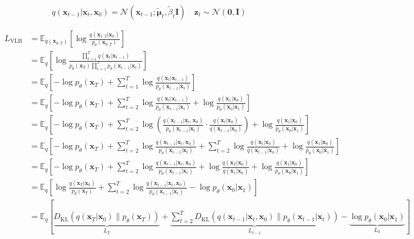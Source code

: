 \documentclass[a4paper, 11pt]{article}
\begin{document}
\begin{equation*}
    q(\mathbf{x}_{t-1}|\mathbf{x}_t, \mathbf{x}_0) = \mathcal{N}\left(\mathbf{x}_{t-1}; \tilde{\boldsymbol{\mu}}_t, \tilde{\beta}_t\mathbf{I}\right)\quad \mathbf{z}_t\sim\mathcal{N}(\mathbf{0}, \mathbf{I})
\end{equation*}

\newpage

\begin{align*}
    L_{\text{VLB}} &= \mathbb{E}_{q(\mathbf{x}_{0:T})} \left[ \log \frac{q(\mathbf{x}_{1:T}|\mathbf{x}_0)}{p_\theta(\mathbf{x}_{0:T})} \right] \\[12pt]
    &= \mathbb{E}_q \left[ \log \frac{\prod_{t=1}^T q(\mathbf{x}_t|\mathbf{x}_{t-1})}{p_\theta(\mathbf{x}_T) \prod_{t=1}^T p_\theta(\mathbf{x}_{t-1}|\mathbf{x}_t)} \right] \\[12pt]
    &= \mathbb{E}_q \left[ -\log p_\theta(\mathbf{x}_T) + \sum_{t=1}^T \log \frac{q(\mathbf{x}_t|\mathbf{x}_{t-1})}{p_\theta(\mathbf{x}_{t-1}|\mathbf{x}_t)} \right] \\[12pt]
    &= \mathbb{E}_q \left[ -\log p_\theta(\mathbf{x}_T) + \sum_{t=2}^T \log \frac{q(\mathbf{x}_t|\mathbf{x}_{t-1})}{p_\theta(\mathbf{x}_{t-1}|\mathbf{x}_t)} + \log \frac{q(\mathbf{x}_1|\mathbf{x}_0)}{p_\theta(\mathbf{x}_0|\mathbf{x}_1)} \right] \\[12pt]
    &= \mathbb{E}_q \left[ -\log p_\theta(\mathbf{x}_T) + \sum_{t=2}^T \log \left( \frac{q(\mathbf{x}_{t-1}|\mathbf{x}_t, \mathbf{x}_0)}{p_\theta(\mathbf{x}_{t-1}|\mathbf{x}_t)} \cdot \frac{q(\mathbf{x}_t|\mathbf{x}_0)}{q(\mathbf{x}_{t-1}|\mathbf{x}_0)} \right) + \log \frac{q(\mathbf{x}_1|\mathbf{x}_0)}{p_\theta(\mathbf{x}_0|\mathbf{x}_1)} \right] \\[12pt]
    &= \mathbb{E}_q \left[ -\log p_\theta(\mathbf{x}_T) + \sum_{t=2}^T \log \frac{q(\mathbf{x}_{t-1}|\mathbf{x}_t, \mathbf{x}_0)}{p_\theta(\mathbf{x}_{t-1}|\mathbf{x}_t)} + \sum_{t=2}^T \log \frac{q(\mathbf{x}_t|\mathbf{x}_0)}{q(\mathbf{x}_{t-1}|\mathbf{x}_0)} + \log \frac{q(\mathbf{x}_1|\mathbf{x}_0)}{p_\theta(\mathbf{x}_0|\mathbf{x}_1)} \right] \\[12pt]
    &= \mathbb{E}_q \left[ -\log p_\theta(\mathbf{x}_T) + \sum_{t=2}^T \log \frac{q(\mathbf{x}_{t-1}|\mathbf{x}_t, \mathbf{x}_0)}{p_\theta(\mathbf{x}_{t-1}|\mathbf{x}_t)} + \log \frac{q(\mathbf{x}_T|\mathbf{x}_0)}{q(\mathbf{x}_1|\mathbf{x}_0)} + \log \frac{q(\mathbf{x}_1|\mathbf{x}_0)}{p_\theta(\mathbf{x}_0|\mathbf{x}_1)} \right] \\[12pt]
    &= \mathbb{E}_q \left[ \log \frac{q(\mathbf{x}_T|\mathbf{x}_0)}{p_\theta(\mathbf{x}_T)} + \sum_{t=2}^T \log \frac{q(\mathbf{x}_{t-1}|\mathbf{x}_t, \mathbf{x}_0)}{p_\theta(\mathbf{x}_{t-1}|\mathbf{x}_t)} - \log p_\theta(\mathbf{x}_0|\mathbf{x}_1) \right] \\[12pt]
    &= \mathbb{E}_q \left[ \underbrace{D_{\text{KL}}(q(\mathbf{x}_T|\mathbf{x}_0) \parallel p_\theta(\mathbf{x}_T))}_{L_T} + \underbrace{\sum_{t=2}^T D_{\text{KL}}(q(\mathbf{x}_{t-1}|\mathbf{x}_t, \mathbf{x}_0) \parallel p_\theta(\mathbf{x}_{t-1}|\mathbf{x}_t))}_{L_{t-1}} - \underbrace{\log p_\theta(\mathbf{x}_0|\mathbf{x}_1)}_{L_0} \right]
\end{align*}
\end{document}

